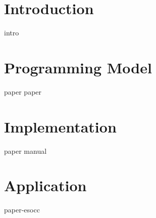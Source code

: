 \documentclass[%
   paper=A4,               %
   twoside=true,           %
   openright,              %
   parskip=full,           %
   chapterprefix=true,        %
   11pt,                %
   headings=normal,        %
   bibliography=totoc,        %
   listof=totoc,           %
   titlepage=on,           %
   captions=tableabove,    %
   draft=false,            %
]{scrreprt}%
\begin{document}
\pagestyle{empty}          
% 
    
\cleardoublepage

\pagestyle{plain}          
      
\cleardoublepage
%
 
\cleardoublepage
%
\setcounter{tocdepth}{2}      
\tableofcontents           
\cleardoublepage

\setcounter{page}{1}       %
\pagestyle{maincontentstyle}  %

\part[Introduction]{Introduction}
{intro}
\clearpage

\part[Programming Model]{Programming Model}
{paper}
{paper}
\clearpage

\part[Implementation]{Implementation}
{paper}
{manual}
\clearpage

\part[Application]{Application}
{paper-esocc}
\clearpage

\cleardoublepage

{%
\renewcommand{\bibfont}{\normalfont\small}
\setlength{\biblabelsep}{5pt}
\setlength{\bibitemsep}{0.5\baselineskip plus 0.5\baselineskip}
\printbibliography
}
\cleardoublepage
\end{document}
